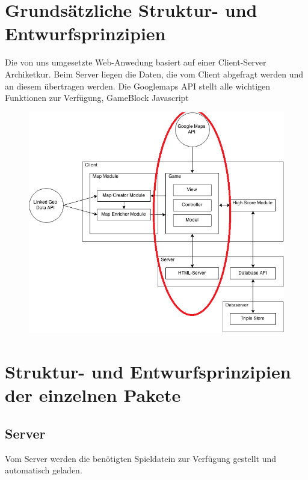 \documentclass[11pt,a4paper]{article}
\begin{document}
\section{Grundsätzliche Struktur- und Entwurfsprinzipien}
Die von uns umgesetzte Web-Anwedung basiert auf einer Client-Server Archiketkur.  Beim Server liegen die Daten, die vom Client abgefragt werden und an diesem übertragen werden. Die Googlemaps API stellt alle wichtigen Funktionen zur Verfügung, GameBlock Javascript 
\begin{figure}[htb]
  \centering
  \includegraphics[scale=0.4]{arch.png}
  \label{PNFs}
\end{figure} 



\section{Struktur- und Entwurfsprinzipien der einzelnen Pakete}
\subsection{Server} Vom Server werden die benötigten Spieldatein zur Verfügung gestellt und automatisch geladen.
\end{document}
